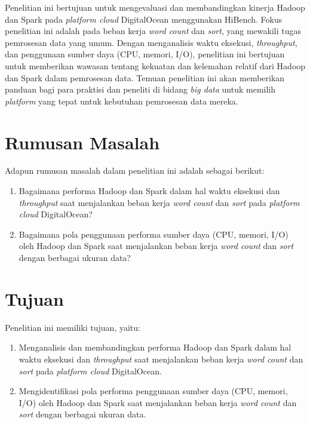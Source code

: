 Penelitian ini bertujuan untuk mengevaluasi dan membandingkan kinerja Hadoop dan Spark pada \textit{platform cloud} DigitalOcean menggunakan HiBench. Fokus penelitian ini adalah pada beban kerja \textit{word count} dan \textit{sort}, yang mewakili tugas pemrosesan data yang umum. Dengan menganalisis waktu eksekusi, \textit{throughput}, dan penggunaan sumber daya (CPU, memori, I/O), penelitian ini bertujuan untuk memberikan wawasan tentang kekuatan dan kelemahan relatif dari Hadoop dan Spark dalam pemrosesan data. Temuan penelitian ini akan memberikan panduan bagi para praktisi dan peneliti di bidang \textit{big data} untuk memilih \textit{platform} yang tepat untuk kebutuhan pemrosesan data mereka.

\section{Rumusan Masalah}
Adapun rumusan masalah dalam penelitian ini adalah sebagai berikut:
\begin{enumerate}
\item Bagaimana performa Hadoop dan Spark dalam hal waktu eksekusi dan \textit{throughput} saat menjalankan beban kerja \textit{word count} dan \textit{sort} pada \textit{platform cloud} DigitalOcean?
\item Bagaimana pola penggunaan performa sumber daya (CPU, memori, I/O) oleh Hadoop dan Spark saat menjalankan beban kerja \textit{word count} dan \textit{sort} dengan berbagai ukuran data?
\end{enumerate}

\section{Tujuan}
Penelitian ini memiliki tujuan, yaitu:
\begin{enumerate}
\item Menganalisis dan membandingkan performa Hadoop dan Spark dalam hal waktu eksekusi dan \textit{throughput} saat menjalankan beban kerja \textit{word count} dan \textit{sort} pada \textit{platform cloud} DigitalOcean.
\item Mengidentifikasi pola performa penggunaan sumber daya (CPU, memori, I/O) oleh Hadoop dan Spark saat menjalankan beban kerja \textit{word count} dan \textit{sort} dengan berbagai ukuran data.
\end{enumerate}

